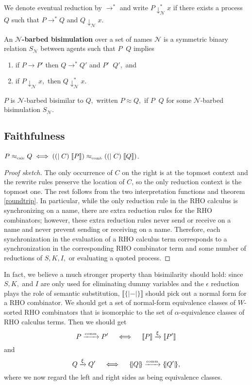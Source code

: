 \documentclass[a4paper,UKenglish]{lipics-v2016}
\newcommand{\Ncal}{\mathcal{N}}
\newcommand{\interp}[1]{\llbracket #1 \rrbracket}
\newcommand{\interpp}[1]{\{\!| #1 |\!\}}
\begin{document}
We denote eventual reduction by $\to^*$ and write $P \downarrow^*_\Ncal x$ if there exists a process $Q$ such that $P \to^* Q$ and $Q \downarrow_\Ncal x.$

An {\bf $\Ncal$-barbed bisimulation} over a set of names $\Ncal$ is a symmetric binary relation $S_\Ncal$ between agents such that $P \mathop{S_\Ncal} Q$ implies
\begin{enumerate}
  \item if $P \to P'$ then $Q \to^* Q'$ and $P' \mathop{S_\Ncal} Q',$ and 
  \item if $P \downarrow_\Ncal x,$ then $Q \downarrow^*_\Ncal x.$
\end{enumerate}
$P$ is $\Ncal$-barbed bisimilar to $Q,$ written $P \approx Q,$ if $P \mathop{S_\Ncal} Q$ for some $\Ncal$-barbed bisimulation $S_\Ncal.$

\subsection{Faithfulness}

\begin{theorem}
  $P \approx_{\mbox{\tiny calc}} Q \iff  ((|\; C)\; \interp{P}) \approx_{\mbox{\tiny comb}} ((|\; C)\; \interp{Q})$.
\end{theorem}

\begin{proof}[Proof sketch]
The only occurrence of $C$ on the right is at the topmost context and the rewrite rules preserve the location of $C$, so the only reduction context is the topmost one.  The rest follows from the two interpretation functions and theorem \ref{roundtrip}.  In particular, while the only reduction rule in the RHO calculus is synchronizing on a name, there are extra reduction rules for the RHO combinators; however, these extra reduction rules never send or receive on a name and never prevent sending or receiving on a name.  Therefore, each synchronization in the evaluation of a RHO calculus term corresponds to a synchronization in the corresponding RHO combinator term and some number of reductions of $S,K,I,$ or evaluating a quoted process.
\end{proof}

In fact, we believe a much stronger property than bisimilarity should hold: since $S,K,$ and $I$ are only used for eliminating dummy variables and the $\epsilon$ reduction plays the role of semantic substitution, $\interp{\interpp{-}}$ should pick out a normal form for a RHO combinator.  We should get a set of normal-form equivalence classes of $W$-sorted RHO combinators that is isomorphic to the set of $\alpha$-equivalence classes of RHO calculus terms.  Then we should get
\[ P \xrightarrow{\mbox{\tiny comm}} P' \quad \iff \quad \interp{P} \xrightarrow{\xi} \interp{P'}\]
and
\[ Q \xrightarrow{\xi} Q' \quad \iff \quad \interpp{Q} \xrightarrow{\mbox{\tiny comm}} \interpp{Q'}, \]
where we now regard the left and right sides as being equivalence classes.
\end{document}
